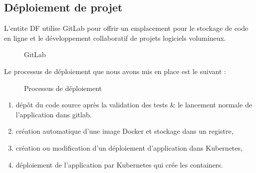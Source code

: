 \subsection{D\'eploiement de projet}

L'entite \gls{DF} utilise GitLab pour offrir un emplacement pour le stockage de code en ligne et le d\'eveloppement collaboratif de projets logiciels volumineux.

\begin{figure}[H]
	\caption{\label{fig:my-label} GitLab}
\end{figure}

Le processus de d\'eploiement que nous avons mis en place est le suivant :

\begin{figure}[H]
	\caption{\label{fig:my-label} Processus de d\'eploiement}
\end{figure}

\begin{enumerate}
\item d\'ep\^ot du code source apr\`es la validation des tests \& le lancement normale de l'application dans gitlab. 
\item cr\'eation automatique d'une image Docker et stockage dans un registre,
\item cr\'eation ou modification d'un d\'eploiement d'application dans Kubernetes,
\item d\'eploiement de l'application par Kubernetes qui cr\'ee les containers.
\end{enumerate}


